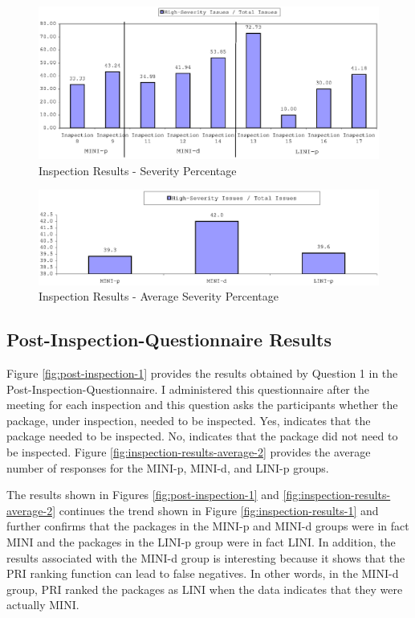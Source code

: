 \begin{figure}[!htb]
  \centering
  \includegraphics[width=1.0\textwidth]{figs/Results/inspection-results-2.eps}
  \caption{Inspection Results - Severity Percentage}
  \label{fig:inspection-results-2}
\end{figure}

\begin{figure}[!htb]
  \centering
  \includegraphics[width=1.0\textwidth]{figs/Results/inspection-results-average-1-percent.eps}
  \caption{Inspection Results - Average Severity Percentage}
  \label{fig:inspection-results-average-1-percent}
\end{figure}

\newpage
\subsection{Post-Inspection-Questionnaire Results}
Figure \ref{fig:post-inspection-1} provides the results obtained by
Question 1 in the Post-Inspection-Questionnaire. I administered this
questionnaire after the meeting for each inspection and this question asks
the participants whether the package, under inspection, needed to be
inspected. Yes, indicates that the package needed to be inspected. No,
indicates that the package did not need to be inspected. Figure
\ref{fig:inspection-results-average-2} provides the average number of
responses for the MINI-p, MINI-d, and LINI-p groups.

The results shown in Figures \ref{fig:post-inspection-1} and
\ref{fig:inspection-results-average-2} continues the trend shown in Figure
\ref{fig:inspection-results-1} and further confirms that the packages in
the MINI-p and MINI-d groups were in fact MINI and the packages in the
LINI-p group were in fact LINI. In addition, the results associated with
the MINI-d group is interesting because it shows that the PRI ranking
function can lead to false negatives. In other words, in the MINI-d group,
PRI ranked the packages as LINI when the data indicates that they were
actually MINI.

